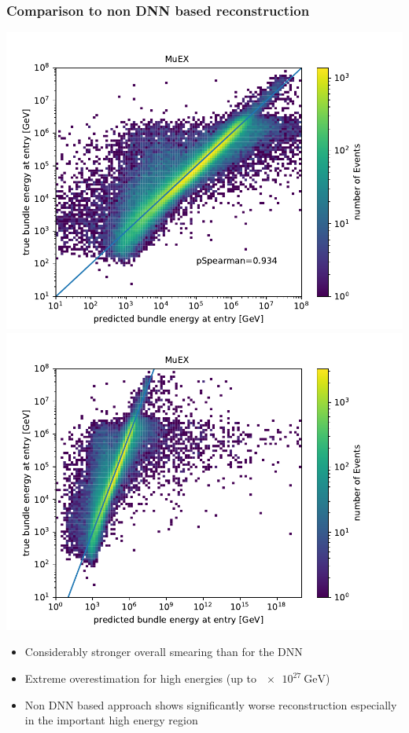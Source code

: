\documentclass[aspectratio=1610, 9pt]{beamer}
\begin{document}
\begin{frame}
  \frametitle{Comparison to non DNN based reconstruction}
  \includegraphics[scale=0.45]{Plots/correlation_muex_bundle.pdf}
  \includegraphics[scale=0.45]{Plots/correlation_muex_bundle2.pdf}
  \begin{itemize}
    \item Considerably stronger overall smearing than for the DNN
    \item Extreme overestimation for high energies (up to $\SI{e27}{\giga\electronvolt}$)
    \item Non DNN based approach shows significantly worse reconstruction especially in the important high energy region
  \end{itemize}
\end{frame}
\end{document}

